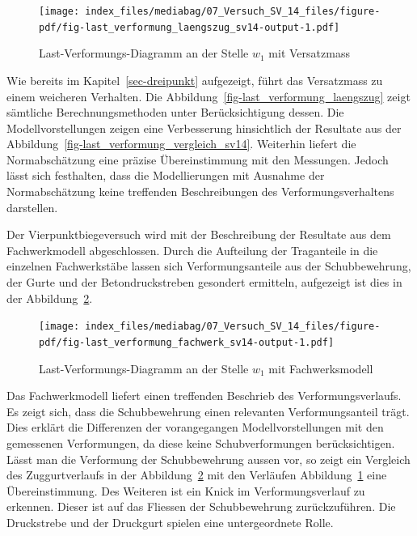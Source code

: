\documentclass[
  12pt,
  letterpaper,
  egregdoesnotlikesansseriftitles]{scrreprt}
\begin{document}
\begin{figure}[H]

{\centering \texttt{[image: index\_files/mediabag/07\_Versuch\_SV\_14\_files/figure-pdf/fig-last\_verformung\_laengszug\_sv14-output-1.pdf]}

}

\caption{\label{fig-last_verformung_laengszug_sv14}Last-Verformungs-Diagramm
an der Stelle \(w_1\) mit Versatzmass}

\end{figure}

Wie bereits im Kapitel~\ref{sec-dreipunkt} aufgezeigt, führt das
Versatzmass zu einem weicheren Verhalten. Die
Abbildung~\ref{fig-last_verformung_laengszug} zeigt sämtliche
Berechnungsmethoden unter Berücksichtigung dessen. Die
Modellvorstellungen zeigen eine Verbesserung hinsichtlich der Resultate
aus der Abbildung~\ref{fig-last_verformung_vergleich_sv14}. Weiterhin
liefert die Normabschätzung eine präzise Übereinstimmung mit den
Messungen. Jedoch lässt sich festhalten, dass die Modellierungen mit
Ausnahme der Normabschätzung keine treffenden Beschreibungen des
Verformungsverhaltens darstellen.

Der Vierpunktbiegeversuch wird mit der Beschreibung der Resultate aus
dem Fachwerkmodell abgeschlossen. Durch die Aufteilung der Traganteile
in die einzelnen Fachwerkstäbe lassen sich Verformungsanteile aus der
Schubbewehrung, der Gurte und der Betondruckstreben gesondert ermitteln,
aufgezeigt ist dies in der
Abbildung~\ref{fig-last_verformung_fachwerk_sv14}.

\begin{figure}[H]

{\centering \texttt{[image: index\_files/mediabag/07\_Versuch\_SV\_14\_files/figure-pdf/fig-last\_verformung\_fachwerk\_sv14-output-1.pdf]}

}

\caption{\label{fig-last_verformung_fachwerk_sv14}Last-Verformungs-Diagramm
an der Stelle \(w_1\) mit Fachwerksmodell}

\end{figure}

Das Fachwerkmodell liefert einen treffenden Beschrieb des
Verformungsverlaufs. Es zeigt sich, dass die Schubbewehrung einen
relevanten Verformungsanteil trägt. Dies erklärt die Differenzen der
vorangegangen Modellvorstellungen mit den gemessenen Verformungen, da
diese keine Schubverformungen berücksichtigen. Lässt man die Verformung
der Schubbewehrung aussen vor, so zeigt ein Vergleich des
Zuggurtverlaufs in der Abbildung~\ref{fig-last_verformung_fachwerk_sv14}
mit den Verläufen Abbildung~\ref{fig-last_verformung_laengszug_sv14}
eine Übereinstimmung. Des Weiteren ist ein Knick im Verformungsverlauf
zu erkennen. Dieser ist auf das Fliessen der Schubbewehrung
zurückzuführen. Die Druckstrebe und der Druckgurt spielen eine
untergeordnete Rolle.
\end{document}
